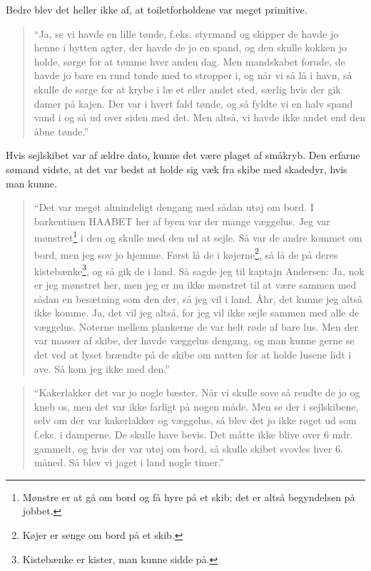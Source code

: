 Bedre blev det heller ikke af, at toiletforholdene var meget primitive.

\begin{quote}
``Ja, se vi havde en lille tønde, f.eks. styrmand og skipper de havde jo
henne i hytten agter, der havde de jo en spand, og den skulle kokken jo
holde, sørge for at tømme hver anden dag. Men mandskabet forude, de
havde jo bare en rund tønde med to stropper i, og når vi så lå i havn,
så skulle de sørge for at krybe i læ et eller andet sted, særlig hvis
der gik damer på kajen. Der var i hvert fald tønde, og så fyldte vi en
halv spand vand i og så ud over siden med det. Men altså, vi havde ikke
andet end den åbne tønde.''
\end{quote}

Hvis sejlskibet var af ældre dato, kunne det være plaget af småkryb. Den
erfarne sømand vidste, at det var bedst at holde sig væk fra skibe med
skadedyr, hvis man kunne.

\begin{quote}
``Det var meget almindeligt dengang med sådan utøj om bord. I
barkentinen HAABET her af byen var der mange væggelus. Jeg var
mønstret\footnote{Mønstre er at gå om bord og få hyre på et skib; det er
  altså begyndelsen på jobbet.} i den og skulle med den ud at sejle. Så
var de andre kommet om bord, men jeg sov jo hjemme. Først lå de i
køjerne\footnote{Køjer er senge om bord på et skib.}, så lå de på deres
kistebænke\footnote{Kistebænke er kister, man kunne sidde på.}, og så
gik de i land. Så sagde jeg til kaptajn Andersen: Ja, nok er jeg
mønstret her, men jeg er nu ikke mønstret til at være sammen med sådan
en besætning som den der, så jeg vil i land. Åhr, det kunne jeg altså
ikke komme. Ja, det vil jeg altså, for jeg vil ikke sejle sammen med
alle de væggelus. Noterne mellem plankerne de var helt røde af bare lus.
Men der var masser af skibe, der havde væggelus dengang, og man kunne
gerne se det ved at lyset brændte på de skibe om natten for at holde
lusene lidt i ave. Så kom jeg ikke med den.''
\end{quote}

\begin{quote}
``Kakerlakker det var jo nogle bæster. Når vi skulle sove så rendte de
jo og kneb os, men det var ikke farligt på nogen måde. Men se der i
sejlskibene, selv om der var kakerlakker og væggelus, så blev det jo
ikke røget ud som f.eks. i damperne. De skulle have bevis. Det måtte
ikke blive over 6 mdr. gammelt, og hvis der var utøj om bord, så skulle
skibet svovles hver 6. måned. Så blev vi jaget i land nogle timer.''
\end{quote}
